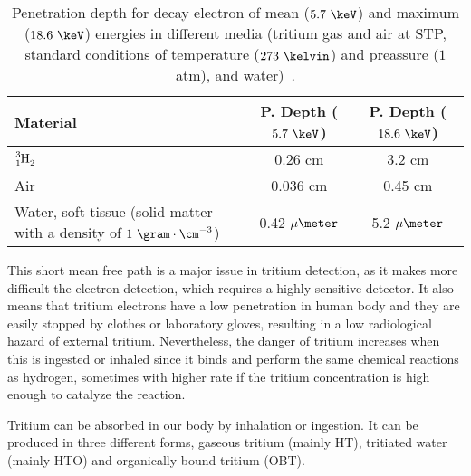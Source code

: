 \begin{table}[htbp]
\centering{}%
\begin{tabular}{lcc}
\toprule 
Material & P. Depth ($5.7~\keV$) & P. Depth ($18.6~\keV$) \tabularnewline
\midrule
\midrule 
$\ce{\ce{^{3}_{1}H_2}}$ & 0.26 cm & 3.2 cm \tabularnewline
Air & 0.036 cm & 0.45 cm \tabularnewline
\parbox{10em}{ Water, soft tissue\\  (solid matter with a \\  density of $1~\gram\cdot\cm^{-3}$)} & 0.42 $\mu\meter$ & 5.2 $\mu\meter$ \tabularnewline
\bottomrule
\end{tabular}
\caption{Penetration depth for decay electron of mean ($5.7~\keV$) and maximum ($18.6~\keV$) energies in different media (tritium gas and air at STP, standard conditions of temperature ($273~\kelvin$) and preassure ($1$ atm), and water)~\cite{MeanFreePathDocument}.}
\label{tab:MeanFreePathTritium}
\end{table}

This short mean free path is a major issue in tritium detection, as it makes more difficult the electron detection, which requires a highly sensitive detector. It also means that tritium electrons have a low penetration in human body and they are easily stopped by clothes or laboratory gloves, resulting in a low radiological hazard of external tritium. Nevertheless, the danger of tritium increases when this is ingested or inhaled since it binds and perform the same chemical reactions as hydrogen, sometimes with higher rate if the tritium concentration is high enough to catalyze the reaction. 

Tritium can be absorbed in our body by inhalation or ingestion. It can be produced in three different forms, gaseous tritium (mainly HT), tritiated water (mainly HTO) and organically bound tritium (OBT).

